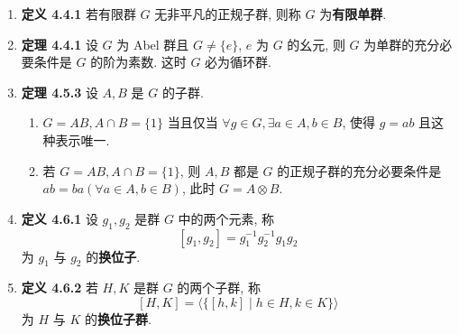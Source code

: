 \documentclass{ctexart}
\begin{document}
\begin{enumerate}
\item \textbf{定义 4.4.1} 若有限群 $G$ 无非平凡的正规子群, 则称 $G$ 为\textbf{有限单群}.

\item \textbf{定理 4.4.1} 设 $G$ 为 Abel 群且 $G\neq\{e\}$, $e$ 为 $G$ 的幺元, 则 $G$ 为单群的充分必要条件是 $G$ 的阶为素数. 这时 $G$ 必为循环群.

\item \textbf{定理 4.5.3} 设 $A,B$ 是 $G$ 的子群.
\begin{enumerate}
  \item $G=AB,A\cap B=\{1\}$ 当且仅当 $\forall g\in G, \exists a\in A,b\in B$, 使得 $g=ab$ 且这种表示唯一.
  \item 若 $G=AB, A\cap B=\{1\}$, 则 $A,B$ 都是 $G$ 的正规子群的充分必要条件是 $ab=ba(\forall a\in A,b\in B)$, 此时 $G=A\otimes B$.
\end{enumerate}

\item \textbf{定义 4.6.1} 设 $g_1,g_2$ 是群 $G$ 中的两个元素, 称
\[
[g_1,g_2] = g_1^{-1}g_2^{-1}g_1g_2
\]
为 $g_1$ 与 $g_2$ 的\textbf{换位子}.

\item \textbf{定义 4.6.2} 若 $H,K$ 是群 $G$ 的两个子群, 称
\[
[H,K] = \langle\{[h,k]\mid h\in H,k\in K\}\rangle
\]
为 $H$ 与 $K$ 的\textbf{换位子群}.
\end{enumerate}
\end{document}

